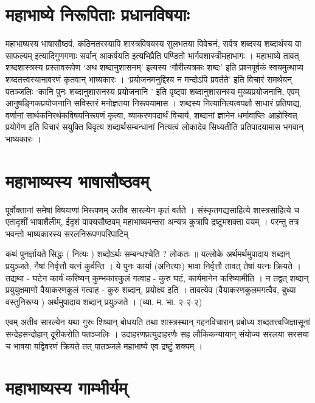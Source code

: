 {\section*{महाभाष्ये निरूपिताः प्रधानविषयाः}

महाभाष्यस्य भाषासौष्ठवं, कठिनतरस्यापि शास्त्रविषयस्य सुलभतया विवेचनं, सर्वत्र शब्दस्य शब्दार्थस्य वा साफल्यम् इत्यादिगुणगणाः सर्वान् आकर्षयति इत्यभिप्रैति पण्डितो भार्गवशास्त्रीमहाभागः । महाभाष्ये तावत् शब्दशास्त्रस्य प्रस्तावरूपेण ‘अथ शब्दानुशासनम्’ इत्यस्य ‘गौरीत्यत्रकः शब्दः’ इति प्रश्नपूर्वकं स्वयमुत्थाप्य शब्दतत्त्वस्यानावरणं कृतवान् भाष्यकारः । ‘प्रयोजनमनुद्दिश्य न मन्दोऽपि प्रवर्तते’ इति विचारं समर्थयन् पतञ्जलिः ‘कानि पुनः शब्दानुशासनस्य प्रयोजनानि ’ इति पृष्ट्वा शब्दानुशासनस्य मुख्यप्रयोजनानि, एवम् आनुषङ्गिकप्रयोजनानि सविस्तरं मनोज्ञतया निरूपयामास । शब्दस्य नित्यानित्यत्वपक्षौ साधारं प्रतिपाद्य, वर्णानां सार्थकनिरर्थकविषयनिरूपणं कृत्वा, व्याकरणपदार्थं विचार्य, शब्दानां ज्ञानेन धर्मावाप्तिः आहोस्वित् प्रयोगेण इति विचारं सयुक्ति विवृत्य शब्दार्थसम्बन्धानां नित्यत्वं लोकादेव सिध्यतीति प्रतिपादयामास भगवान् भाष्यकारः ।

\section*{महाभाष्यस्य भाषासौष्ठवम्}

पूर्वोक्तानां समेषां विषयाणां मिरूपणम् अतीव सारल्येन कृतं वर्तते । संस्कृतगद्यसाहित्ये शास्त्रसाहित्ये च एतादृशीं भाषाशैलीम्, ईदृशं वाक्यसौष्ठवम् महाभाष्यमन्तरा अन्यत्र कुत्रापि द्रष्टुमशक्ता वयम् । परन्तु तत्र भवन्तो भाष्यकारस्य सरलनिरूपणपरिपाटिम्

कथं पुनर्ज्ञायते सिद्धः ( नित्यः ) शब्दोऽर्थः सम्बन्धश्चेति ? लोकतः ॥ यल्लोके अर्थमर्थमुपादाय शब्दान् प्रयुञ्जते, नैषां निर्वृत्तौ यत्नं कुर्वन्ति । ये पुनः कार्या (अनित्याः) भावा निर्वृत्तौ तावत् तेषां यत्नः क्रियते । तद्यथा - घटेन कार्यं करिष्यन् कुम्भकारकुलं गत्वाह - कुरु घटं, कार्यमानेन करिष्यामीति । न तद्वत् शब्दान् प्रयुयुक्षमाणो वैयाकरणकुलं गत्वाह - कुरु शब्दान्, प्रयोक्ष्य इति । तावत्येव (वैयाकरणकुलमगत्वैव, बुध्या वस्तुनिरूप्य ) अर्थमुपादाय शब्दान् प्रयुञ्जते । (व्या. म. भा. २-२-२)

एवम् अतीव सारल्येन यथा गुरुः शिष्यान् बोधयति तथा शास्त्रस्थान् गहनविचारान् प्रबोध्य शब्दतत्त्वजिज्ञासूनां सन्देहसन्दोहान् दूरीकरोति पतञ्जलिः । उदाहरणप्रत्युदाहरणैः सह लौकिकन्यायान् संयोज्य सरलया सरसया च भाषया यद्विवरणं क्रियते तत् पातञ्जले महाभाष्ये एव द्रष्टुं शक्यम् ।

\section*{महाभाष्यस्य गाम्भीर्यम्}

}
